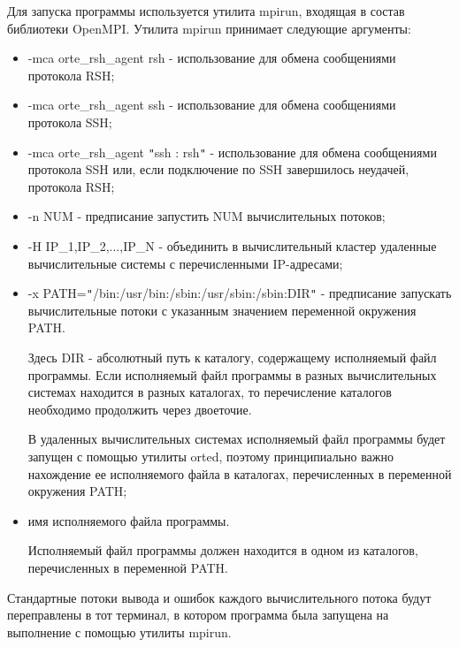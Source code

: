 \begin{enumerate}
	Для запуска программы используется утилита mpirun, входящая в состав библиотеки OpenMPI. Утилита mpirun принимает следующие аргументы:

	\begin{itemize}

		\item -mca orte\_rsh\_agent rsh - использование для обмена сообщениями протокола RSH;
		\item -mca orte\_rsh\_agent ssh - использование для обмена сообщениями протокола SSH;
		\item -mca orte\_rsh\_agent \verb|"|ssh : rsh\verb|"| - использование для обмена сообщениями протокола SSH или, если подключение по SSH завершилось неудачей, протокола RSH;
		\item -n NUM - предписание запустить NUM вычислительных потоков;
		\item -H IP\_1,IP\_2,...,IP\_N - объединить в вычислительный кластер удаленные вычислительные системы с перечисленными IP-адресами;
		\item -x PATH=\verb|"|/bin:/usr/bin:/sbin:/usr/sbin:/sbin:DIR\verb|"| - предписание запускать вычислительные потоки с указанным значением переменной окружения PATH.

		Здесь DIR - абсолютный путь к каталогу, содержащему исполняемый файл программы. Если исполняемый файл программы в разных вычислительных системах находится в разных каталогах, то перечисление каталогов необходимо продолжить через двоеточие.

		В удаленных вычислительных системах исполняемый файл программы будет запущен с помощью утилиты orted, поэтому принципиально важно нахождение ее исполняемого файла в каталогах, перечисленных в переменной окружения PATH;

		\item имя исполняемого файла программы.

		Исполняемый файл программы должен находится в одном из каталогов, перечисленных в переменной PATH.

	\end{itemize}

	Стандартные потоки вывода и ошибок каждого вычислительного потока будут переправлены в тот терминал, в котором программа была запущена на выполнение с помощью утилиты mpirun.

\end{enumerate}

